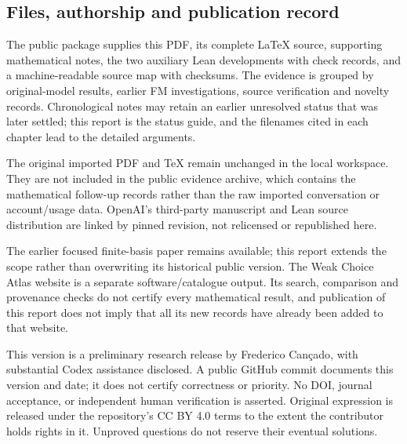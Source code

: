 \subsection{Files, authorship and publication record}
The public package supplies this PDF, its complete LaTeX source, supporting mathematical notes, the two auxiliary Lean developments with check records, and a machine-readable source map with checksums. The evidence is grouped by original-model results, earlier FM investigations, source verification and novelty records. Chronological notes may retain an earlier unresolved status that was later settled; this report is the status guide, and the filenames cited in each chapter lead to the detailed arguments.

The original imported PDF and TeX remain unchanged in the local workspace. They are not included in the public evidence archive, which contains the mathematical follow-up records rather than the raw imported conversation or account/usage data. OpenAI's third-party manuscript and Lean source distribution are linked by pinned revision, not relicensed or republished here.

The earlier focused finite-basis paper remains available; this report extends the scope rather than overwriting its historical public version. The Weak Choice Atlas website is a separate software/catalogue output. Its search, comparison and provenance checks do not certify every mathematical result, and publication of this report does not imply that all its new records have already been added to that website.

This version is a preliminary research release by Frederico Can\c{c}ado, with substantial Codex assistance disclosed. A public GitHub commit documents this version and date; it does not certify correctness or priority. No DOI, journal acceptance, or independent human verification is asserted. Original expression is released under the repository's CC BY 4.0 terms to the extent the contributor holds rights in it. Unproved questions do not reserve their eventual solutions.
